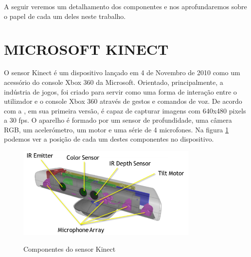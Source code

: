 A seguir veremos um detalhamento dos componentes e nos aprofundaremos sobre o papel de cada um deles neste trabalho. 

\section{MICROSOFT KINECT}

O sensor Kinect é um dispositivo lançado em 4 de Novembro de 2010 como um acessório do console Xbox 360 da Microsoft. Orientado, principalmente, a indústria de jogos, foi criado para servir como uma forma de interação entre o utilizador e o console Xbox 360 através de gestos e comandos de voz. De acordo com a , em sua primeira versão, é capaz de capturar imagens com 640x480 pixels a 30 fps. O aparelho é formado por um sensor de profundidade, uma câmera RGB, um acelerómetro, um motor e uma série de 4 microfones. Na figura \ref{fig:kinect_componentes} podemos ver a posição de cada um destes componentes no dispositivo.

\begin{figure}[H]
    \centering
    \caption{Componentes do sensor Kinect}
	\vspace*{0,2cm}
    \includegraphics[width=0.8\textwidth]{./04-figuras/kinect_componentes}
    \label{fig:kinect_componentes}
\end{figure}
\vspace*{-0,9cm}
{\raggedright {}}\\

